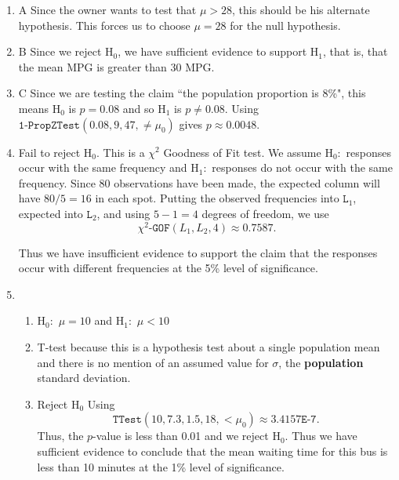 \documentclass{article}
\begin{document}
\newcommand{\answer}[1]{{\color{red}#1}}

\pagestyle{myheadings}

\begin{center}
\textbf{}
\end{center}

\begin{enumerate}

\item \answer{A} Since the owner wants to test that $\mu > 28$, this should be his alternate hypothesis. This forces us to choose $\mu = 28$ for the null hypothesis.

\item \answer{B} Since we reject $\text{H}_0$, we have sufficient evidence to support $\text{H}_1$, that is, that the mean MPG is greater than 30 MPG.

\item \answer{C} Since we are testing the claim ``the population proportion is 8\%", this means $\text{H}_0$ is $p=0.08$ and so $\text{H}_1$ is $p \neq 0.08$. Using $\texttt{1-PropZTest}(0.08, 9, 47, \neq \mu_0)$ gives $p\approx 0.0048$.

\item \answer{Fail to reject $\text{H}_0$.} This is a $\chi^2$ Goodness of Fit test. We assume $\text{H}_0:$ responses occur with the same frequency and $\text{H}_1:$ responses do not occur with the same frequency. Since 80 observations have been made, the expected column will have $80/5=16$ in each spot. Putting the observed frequencies into $\texttt{L}_1$, expected into $\texttt{L}_2$, and using $5-1=4$ degrees of freedom, we use $$\chi^2\texttt{-GOF}(L_1, L_2, 4) \approx 0.7587.$$

Thus we have insufficient evidence to support the claim that the responses occur with different frequencies at the 5\% level of significance.

\item \begin{enumerate}
    \item \answer{$\text{H}_0:$ $\mu = 10$} and \answer{$\text{H}_1:$ $\mu < 10$}
    \item \answer{T-test} because this is a hypothesis test about a single population mean and there is no mention of an assumed value for $\sigma$, the \textbf{population} standard deviation.
    \item \answer{Reject $\text{H}_0$} Using $$\texttt{TTest}(10, 7.3, 1.5, 18, <\mu_0) \approx 3.4157\texttt{E-7}.$$ Thus, the $p$-value is less than 0.01 and we reject $\text{H}_0$. Thus we have sufficient evidence to conclude that the mean waiting time for this bus is less than 10 minutes at the 1\% level of significance.
    \end{enumerate}
    

\end{enumerate}
\end{document}
